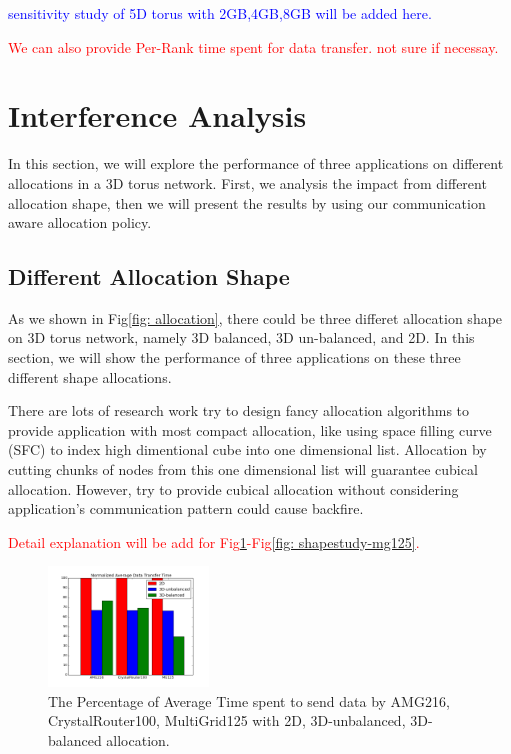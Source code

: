 \documentclass[conference]{IEEEtran}
\begin{document}
\textcolor{blue}{sensitivity study of 5D torus with 2GB,4GB,8GB will be added here. }


\textcolor{red}{We can also provide Per-Rank time spent for data transfer. not sure if necessay.}


\section{Interference Analysis}
In this section, we will explore the performance of three applications on different allocations in a 3D torus network. First, we analysis the impact from different allocation shape, then we will present the results by using our communication aware allocation policy.  

\subsection{Different Allocation Shape}
As we shown in Fig\ref{fig: allocation}, there could be three differet allocation shape on 3D torus network, namely 3D balanced, 3D un-balanced, and 2D. In this section, we will show the performance of three applications on these three different shape allocations.

There are lots of research work try to design fancy allocation algorithms to provide application with most compact allocation, like using space filling curve (SFC) to index high dimentional cube into one dimensional list. Allocation by cutting chunks of nodes from this one dimensional list will guarantee cubical allocation. However, try to provide cubical allocation without considering application's communication pattern could cause backfire.

\textcolor{red}{Detail explanation will be add for Fig\ref{fig: shapestudy-avgtime}-Fig\ref{fig: shapestudy-mg125}.}

\begin{figure}[h!] 
  \centering
  \includegraphics[width=0.38\textwidth]{figs/shapestudy/avgtime}
   \caption{The Percentage of Average Time spent to send data by AMG216, CrystalRouter100, MultiGrid125 with 2D, 3D-unbalanced, 3D-balanced allocation.}
   \label{fig: shapestudy-avgtime}
\end{figure}
\end{document}
